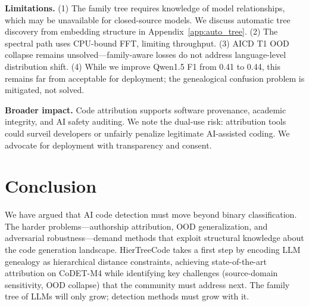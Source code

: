 \documentclass{article}
\begin{document}
\textbf{Limitations.} (1) The family tree requires knowledge of model relationships, which may be unavailable for closed-source models. We discuss automatic tree discovery from embedding structure in Appendix~\ref{app:auto_tree}. (2) The spectral path uses CPU-bound FFT, limiting throughput. (3) AICD T1 OOD collapse remains unsolved---family-aware losses do not address language-level distribution shift. (4) While we improve Qwen1.5 F1 from 0.41 to 0.44, this remains far from acceptable for deployment; the genealogical confusion problem is mitigated, not solved.

\textbf{Broader impact.} Code attribution supports software provenance, academic integrity, and AI safety auditing. We note the dual-use risk: attribution tools could surveil developers or unfairly penalize legitimate AI-assisted coding. We advocate for deployment with transparency and consent.


\section{Conclusion}
\label{sec:conclusion}

We have argued that AI code detection must move beyond binary classification. The harder problems---authorship attribution, OOD generalization, and adversarial robustness---demand methods that exploit structural knowledge about the code generation landscape. HierTreeCode takes a first step by encoding LLM genealogy as hierarchical distance constraints, achieving state-of-the-art attribution on CoDET-M4 while identifying key challenges (source-domain sensitivity, OOD collapse) that the community must address next. The family tree of LLMs will only grow; detection methods must grow with it.
\end{document}
